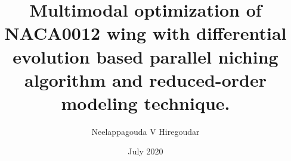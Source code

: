 \documentclass[mtech,thesis,twoside]{misc/iist}
\title{Multimodal optimization of NACA0012 wing with differential evolution based parallel niching algorithm and reduced-order modeling technique.}
\author{Neelappagouda V Hiregoudar}
\date{July 2020}
\begin{document}
\maketitle %
\makecertificate %
\makedeclaration %
\makededication %
\makeacknowledgements %
\makeabstract %
\maketableofcontents %
\makelistoffigures %
\makelistoftables %
\makelistofalgorithms %
\makeabbreviations %
\makenomenclature %

\makechaptersettings 









\makebibsettings




\makeappendixsettings




\makeindexsettings
\end{document}
